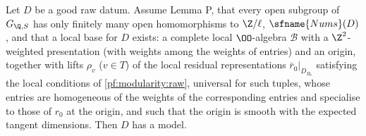 \begin{proposition}\label{pf:modularity:exmodel}
Let $D$ be a good raw datum. Assume Lemma P, that every open subgroup of $G_{\Q,S}$ has only finitely many open
homomorphisms to $\Z/\ell$, $\sfname{Nums}(D)$, and that a local base for $D$ exists: a complete local $\OO$-algebra
$\mathcal B$ with a $\Z^2$-weighted presentation (with weights among the weights of entries) and an origin, together with
lifts $\rho_v$ ($v\in T$) of the local residual representations $\bar r_0|_{D_{B_v}}$ satisfying the local conditions of
\cref{pf:modularity:raw}, universal for such tuples, whose entries are homogeneous of the weights of the corresponding
entries and specialise to those of $r_0$ at the origin, and such that the origin is smooth with the expected tangent
dimensions. Then $D$ has a model.
\end{proposition}

